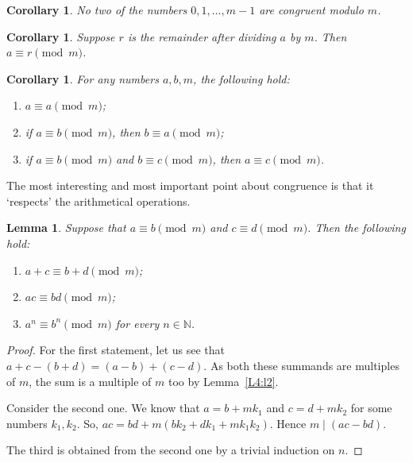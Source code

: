\documentclass[12pt,notitlepage]{article}
\theoremstyle{plain}
\newtheorem{lemma}[thm]{Lemma}
\newtheorem{corr}[thm]{Corollary}
\theoremstyle{definition}
\theoremstyle{plain}
\newcommand{\N}{\mathbb{N}}
\newcommand{\1}{\mathbf{1}}
\newcommand{\0}{\mathbf{0}}
\newcommand{\dvd}{\mathop{\mid}}
\begin{document}
\begin{corr}\label{L4:c9}
No two of the numbers $0, 1,\ldots, m - 1$ are congruent modulo $m$.
\end{corr}

\begin{corr}\label{L4:rem_congr}
Suppose $r$ is the remainder after dividing $a$ by $m$. Then $a \equiv r \pmod m$.
\end{corr}

\begin{corr}
For any numbers $a, b, m$, the following hold:
\begin{enumerate}
\item $a \equiv a \pmod m$;
\item if $a \equiv b \pmod m$, then $b \equiv a \pmod m$;
\item if $a \equiv b \pmod m$ and $b \equiv c \pmod m$, then  $a \equiv c \pmod m$.
\end{enumerate}
\end{corr}
The most interesting and most important point about congruence is that it `respects' the arithmetical operations.
\begin{lemma}\label{L4:l7}
Suppose that $a \equiv b \pmod m$ and $c \equiv d \pmod m$. Then the following hold:
\begin{enumerate}
\item $a + c \equiv b + d \pmod m$;
\item $a c \equiv b  d \pmod m$;
\item $a^n \equiv b^n \pmod m$ for every $n \in \N$.
\end{enumerate}
\end{lemma}
\begin{proof}
For the first statement, let us see that $a + c - (b + d) = (a - b) + (c - d)$. As both these summands are multiples of $m$, the sum is a multiple of $m$ too by Lemma~\ref{L4:l2}.

Consider the second one. We know that $a = b + mk_1$ and $c = d + mk_2$ for some numbers $k_1, k_2$. So, $ac = bd + m(b k_2 + d k_1 + m k_1 k_2)$. Hence $m \dvd (ac - b d)$.

The third is obtained from the second one by a trivial induction on $n$.
\end{proof}
\end{document}
